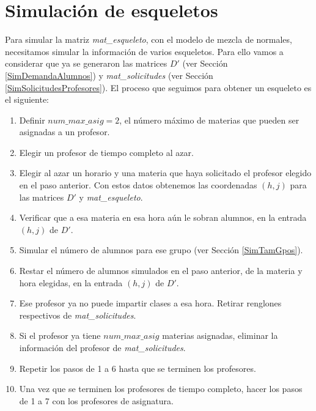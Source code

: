 \section{Simulación de esqueletos} \label{sec_gen_esqueleto}

Para simular la matriz \textit{mat\_esqueleto}, con el modelo de mezcla de normales, necesitamos simular la información de varios esqueletos. Para ello vamos a considerar que ya se generaron las matrices $D'$ (ver Sección \ref{SimDemandaAlumnos}) y \textit{mat\_solicitudes} (ver Sección \ref{SimSolicitudesProfesores}). El proceso que seguimos para obtener un esqueleto es el siguiente:
  
  \begin{enumerate}
%

\item Definir $num\_max\_asig = 2$, el número máximo de materias que pueden ser asignadas a un profesor.

\item Elegir un profesor de tiempo completo al azar.

\item Elegir al azar un horario y una materia que haya solicitado el profesor elegido en el paso anterior. Con estos datos obtenemos las coordenadas $(h,j)$ para las matrices $D'$ y \textit{mat\_esqueleto}.

\item Verificar que a esa materia en esa hora aún le sobran alumnos, en la entrada $(h,j)$ de $D'$.

\item Simular el número de alumnos para ese grupo (ver Sección \ref{SimTamGpos}).

\item Restar el número de alumnos simulados en el paso anterior, de la materia y hora elegidas, en la entrada $(h,j)$ de $D'$.

\item Ese profesor ya no puede impartir clases a esa hora. Retirar renglones respectivos de \textit{mat\_solicitudes}.

\item Si el profesor ya tiene $num\_max\_asig$ materias asignadas, eliminar la información del profesor de \textit{mat\_solicitudes}.

\item Repetir los pasos de 1 a 6 hasta que se terminen los profesores.

\item Una vez que se terminen los profesores de tiempo completo, hacer los pasos de 1 a 7 con los profesores de asignatura.
\end{enumerate}

